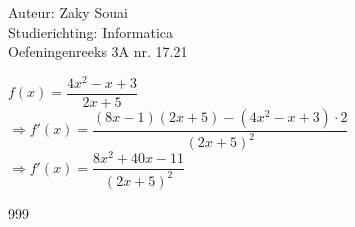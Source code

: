 \documentclass[a4paper]{article}
\begin{document}
  
\noindent \large Auteur: Zaky Souai \\
\noindent \large Studierichting:  Informatica\\
\noindent \large Oefeningenreeks 3A nr. 17.21\\

\bigskip

\normalsize

$f(x) = \dfrac{4x^2 - x +3}{2x+5}$ \\

$\Rightarrow f'(x) = \dfrac{(8x-1)(2x+5) - (4x^2-x+3) \cdot 2}{(2x + 5)^2}$ \\

$\Rightarrow f'(x) = \dfrac{8x^2 + 40x - 11}{(2x + 5)^2}$



\begin{thebibliography}{999}
\end{thebibliography}
\end{document}
